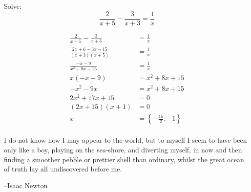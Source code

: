\documentclass[fleqn,addpoints]{exam}
\begin{document}
\begin{questions}
\question
Solve:
\[
  \frac{2}{x+5} - \frac{3}{x+3} = \frac{1}{x}
\]

\begin{solution}
\begin{align*}
  \frac{2}{x+5} - \frac{3}{x+3} &= \frac{1}{x} \\
  \frac{2x+6-3x-15}{(x+3)(x+5)} &= \frac{1}{x} \\
  \frac{-x-9}{x^2+8x+15} &= \frac{1}{x} \\
  x(-x-9) &= x^2+8x+15 \\
  -x^2-9x &= x^2+8x+15 \\
  2x^2 + 17x + 15 &= 0 \\
  (2x+15)(x+1) &= 0 \\
  x &= \left \{ -\frac{15}{2}, -1 \right \} \\
\end{align*}
\end{solution}

\end{questions}

\ifprintanswers
\else
\vspace{1.5 in}

\begin{em}
I do not know how I may appear to the world, but to myself I seem to have been only like a boy, playing on the
sea-shore, and diverting myself, in now and then finding a smoother pebble or prettier shell than ordinary, whilst the
great ocean of truth lay all undiscovered before me.
\end{em}

\vspace{0.1 in}
\hspace{0.5 in} --Isaac Newton

\fi
\end{document}
